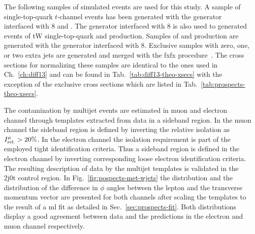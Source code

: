 The following samples of simulated events are used for this study. A sample of single-top-quark $t$-channel events has been generated with the \POWHEG generator interfaced with \PYTHIA{}8 and \MADSPIN. The \POWHEG generator interfaced with \PYTHIA{}8 is also used to generated events of tW single-top-quark and \ttbar production. Samples of \wjets and \zjets production are generated with the \MGAMC generator interfaced with \PYTHIA{}8. Exclusive \wjets samples with zero, one, or two extra jets are generated and merged with the \gls{fxfx} procedure~\cite{Frederix:2012ps}. The cross sections for normalizing these samples are identical to the ones used in Ch.~\ref{ch:diff13} and can be found in Tab.~\ref{tab:diff13-theo-xsecs} with the exception of the exclusive \wjets cross sections which are listed in Tab.~\ref{tab:prospects-theo-xsecs}.



The contamination by multijet events are estimated in muon and electron channel through templates extracted from data in a sideband region. In the muon channel the sideband region is defined by inverting the relative isolation as $\muiso>20\%$. In the electron channel the isolation requirement is part of the employed tight identification criteria. Thus a sideband region is defined in the electron channel by inverting corresponding loose electron identification criteria. The resulting description of data by the multijet templates is validated in the 2j0t control region. In Fig.~\ref{fig:pospects-met-wjets} the \met distribution and the distribution of the difference in $\phi$ angles between the lepton and the transverse momentum vector are presented for both channels after scaling the templates to the result of a \gls{ml} fit as detailed in Sec.~\ref{sec:prospects-fit}. Both distributions display a good agreement between data and the predictions in the electron and muon channel respectively.


